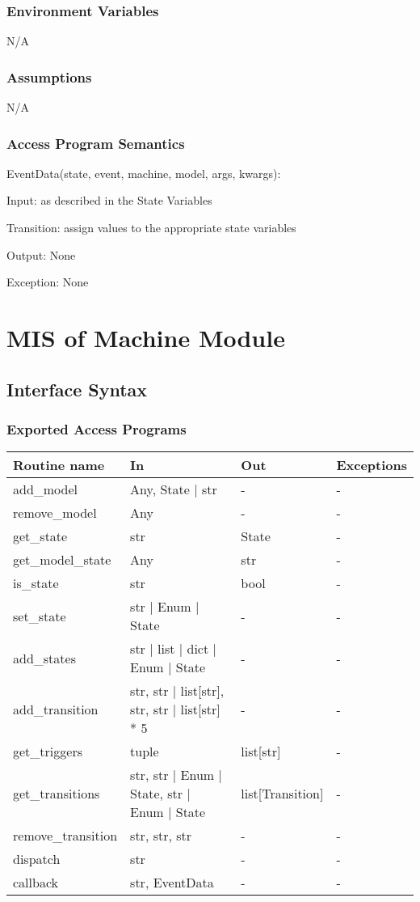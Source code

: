 \documentclass[12pt,titlepage]{article}
\begin{document}
\subsubsection{Environment Variables}
N/A

\subsubsection{Assumptions}
N/A

\subsubsection{Access Program Semantics}

EventData(state, event, machine, model, args, kwargs):

Input: as described in the State Variables

Transition: assign values to the appropriate state variables

Output: None

Exception: None\\

\newpage
\section{MIS of Machine Module}

\subsection{Interface Syntax}
\subsubsection{Exported Access Programs}
\begin{tabular}{| l | l | l | l |}
  \hline
  \textbf{Routine name} & \textbf{In} & \textbf{Out} & \textbf{Exceptions}\\
  \hline
  add\_model & Any, State | str & - & - \\
  remove\_model & Any & - & - \\
  get\_state & str & State & - \\
  get\_model\_state & Any & str & - \\
  is\_state & str & bool & - \\
  set\_state & str | Enum | State & - & - \\
  add\_states & str | list | dict | Enum | State & - & - \\
  add\_transition & str, str | list[str], str, str | list[str] * 5 & - & - \\
  get\_triggers & tuple & list[str] & - \\
  get\_transitions & str, str | Enum | State, str | Enum | State & list[Transition] & - \\
  remove\_transition & str, str, str & - & - \\
  dispatch & str & - & - \\
  callback & str, EventData & - & - \\
  \hline
\end{tabular}
\end{document}
